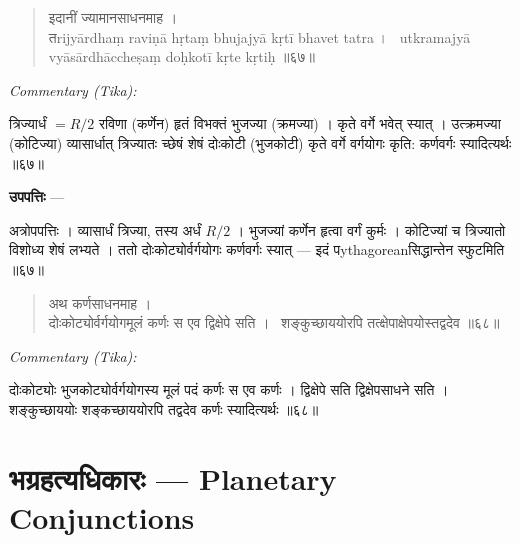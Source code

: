 \documentclass[11pt,a4paper]{article}
\newcommand{\dev}[1]{{\devanagarifont #1}}
\newcommand{\skt}[1]{{\devanagarifont\color{sktcolor} #1}}
\newenvironment{shloka}{%
  \begin{quote}%
  \smallskip%
  \devanagarifont\color{sktcolor}%
}{%
  \smallskip%
  \end{quote}%
}
\newenvironment{tika}{%
  \smallskip%
  \noindent\textit{Commentary (Tika):}\par%
  \smallskip%
  \hindifont\small%
}{%
  \par\smallskip%
}
\newenvironment{upapatti}{%
  \smallskip%
  \noindent\textbf{\devanagarifont उपपत्तिः} — \devanagarifont\small%
}{%
  \par\smallskip%
}
\begin{document}
\begin{shloka}
\skt{इदानीं ज्यामानसाधनमाह ।}\\[0.5em]
\skt{तrijyārdhaṃ raviṇā hṛtaṃ bhujajyā kṛtī bhavet tatra ।}\
\skt{utkramajyā vyāsārdhāccheṣaṃ doḥkotī kṛte kṛtiḥ} ॥६७॥
\end{shloka}

\vspace{0.3cm}
\begin{tika}
\skt{त्रिज्यार्धं} $= R/2$ \skt{रविणा} (कर्णेन) \skt{हृतं} विभक्तं \skt{भुजज्या} (क्रमज्या) । \skt{कृते} वर्गे \skt{भवेत्} स्यात् । \skt{उत्क्रमज्या} (कोटिज्या) \skt{व्यासार्धात्} त्रिज्यातः \skt{च्छेषं} शेषं \skt{दोःकोटी} (भुजकोटी) \skt{कृते} वर्गे वर्गयोगः \skt{कृति:} कर्णवर्गः स्यादित्यर्थः ॥६७॥
\end{tika}

\vspace{0.3cm}
\begin{upapatti}
\skt{अत्रोपपत्तिः} । व्यासार्धं त्रिज्या, तस्य अर्धं $R/2$ । भुजज्यां कर्णेन हृत्वा वर्गं कुर्मः । कोटिज्यां च त्रिज्यातो विशोध्य शेषं लभ्यते । ततो दोःकोट्योर्वर्गयोगः कर्णवर्गः स्यात् — इदं पythagoreanसिद्धान्तेन स्फुटमिति ॥६७॥
\end{upapatti}

\vspace{0.5cm}

\begin{shloka}
\skt{अथ कर्णसाधनमाह ।}\\[0.5em]
\skt{दोःकोट्योर्वर्गयोगमूलं कर्णः स एव द्विक्षेपे सति ।}\
\skt{शङ्कुच्छाययोरपि तत्क्षेपाक्षेपयोस्तद्वदेव} ॥६८॥
\end{shloka}

\vspace{0.3cm}
\begin{tika}
\skt{दोःकोट्योः} भुजकोट्योर्वर्गयोगस्य \skt{मूलं} पदं \skt{कर्णः} स एव कर्णः । \skt{द्विक्षेपे सति} द्विक्षेपसाधने सति । \skt{शङ्कुच्छाययोः} शङ्कच्छाययोरपि तद्वदेव कर्णः स्यादित्यर्थः ॥६८॥
\end{tika}

\newpage
\section[भग्रहत्यधिकारः]{\dev{भग्रहत्यधिकारः} — Planetary Conjunctions}
\label{sec:bhagrahatya}
\end{document}

